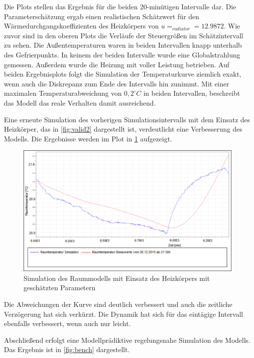Die Plots stellen das Ergebnis für die beiden 20-minütigen Intervalle dar. Die Parameterschätzung ergab einen realistischen Schätzwert für den Wärmedurchgangskoeffizienten des Heizkörpers von $u=_{radiator}=12.9872$.
Wie zuvor sind in den oberen Plots die Verläufe der Steuergrößen im Schätzintervall zu sehen. Die Außentemperaturen waren in beiden Intervallen knapp unterhalb des Gefrierpunkts. In keinem der beiden Intervalle wurde eine Globalstrahlung gemessen. Außerdem wurde die Heizung mit voller Leistung betrieben.
Auf beiden Ergebnisplots folgt die Simulation der Temperaturkurve ziemlich exakt, wenn auch die Diskrepanz zum Ende des Intervalls hin zunimmt. Mit einer maximalen Temperaturabweichung von $0,2^{\circ}C$ in beiden Intervallen, beschreibt das Modell das reale Verhalten damit ausreichend.

Eine erneute Simulation des vorherigen Simulationsintervalls mit dem Einsatz des Heizkörper, das in \ref{fig:valid2} dargestellt ist, verdeutlicht eine Verbesserung des Modells. Die Ergebnisse werden im Plot in \ref{fig:valid2pe} aufgezeigt.

\begin{figure}
\centering
\includegraphics[width=\textwidth]{abbildungen/20160330_validierung2pe}
\caption{Simulation des Raummodells mit Einsatz des Heizkörpers mit geschätzten Parametern}
\label{fig:valid2pe}
\end{figure}

Die Abweichungen der Kurve sind deutlich verbessert und auch die zeitliche Verzögerung hat sich verkürzt. Die Dynamik hat sich für das eintägige Intervall ebenfalls verbessert, wenn auch nur leicht. 

Abschließend erfolgt eine Modellprädiktive regelungsnahe Simulation des Modells. Das Ergebnis ist in \ref{fig:bench} dargestellt.

